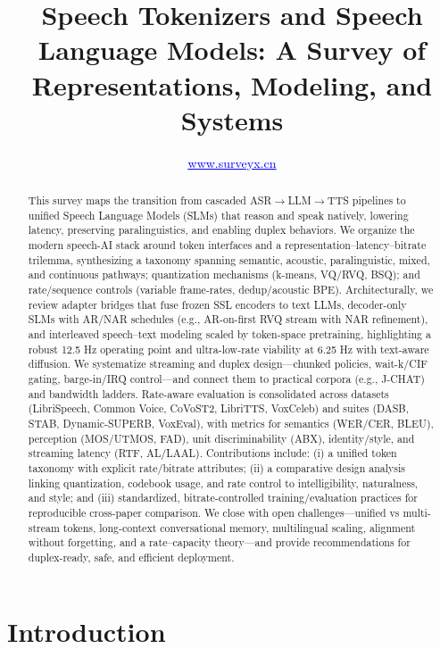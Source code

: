 \documentclass{article}
\title{Speech Tokenizers and Speech Language Models: A Survey of Representations, Modeling, and Systems}
\author{\href{http://www.surveyx.cn}{\textcolor{blue}{\underline{www.surveyx.cn}}}}
\begin{document}
\maketitle

 

\begin{abstract}
This survey maps the transition from cascaded ASR$\rightarrow$LLM$\rightarrow$TTS pipelines to unified Speech Language Models (SLMs) that reason and speak natively, lowering latency, preserving paralinguistics, and enabling duplex behaviors. We organize the modern speech-AI stack around token interfaces and a representation--latency--bitrate trilemma, synthesizing a taxonomy spanning semantic, acoustic, paralinguistic, mixed, and continuous pathways; quantization mechanisms (k-means, VQ/RVQ, BSQ); and rate/sequence controls (variable frame-rates, dedup/acoustic BPE). Architecturally, we review adapter bridges that fuse frozen SSL encoders to text LLMs, decoder-only SLMs with AR/NAR schedules (e.g., AR-on-first RVQ stream with NAR refinement), and interleaved speech--text modeling scaled by token-space pretraining, highlighting a robust 12.5 Hz operating point and ultra-low-rate viability at 6.25 Hz with text-aware diffusion. We systematize streaming and duplex design---chunked policies, wait-k/CIF gating, barge-in/IRQ control---and connect them to practical corpora (e.g., J-CHAT) and bandwidth ladders. Rate-aware evaluation is consolidated across datasets (LibriSpeech, Common Voice, CoVoST2, LibriTTS, VoxCeleb) and suites (DASB, STAB, Dynamic-SUPERB, VoxEval), with metrics for semantics (WER/CER, BLEU), perception (MOS/UTMOS, FAD), unit discriminability (ABX), identity/style, and streaming latency (RTF, AL/LAAL). Contributions include: (i) a unified token taxonomy with explicit rate/bitrate attributes; (ii) a comparative design analysis linking quantization, codebook usage, and rate control to intelligibility, naturalness, and style; and (iii) standardized, bitrate-controlled training/evaluation practices for reproducible cross-paper comparison. We close with open challenges---unified vs multi-stream tokens, long-context conversational memory, multilingual scaling, alignment without forgetting, and a rate--capacity theory---and provide recommendations for duplex-ready, safe, and efficient deployment.
\end{abstract}


\section{Introduction} \label{sec:introduction}
\end{document}
